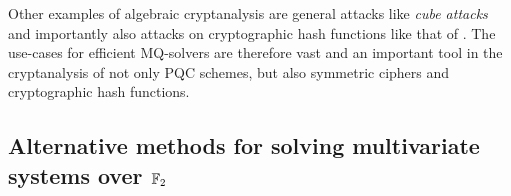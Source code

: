 Other examples of algebraic cryptanalysis are general attacks like \textit{cube attacks} \cite{Videau2011} and importantly also attacks on cryptographic hash functions like that of \cite{fse-2011-23547}. The use-cases for efficient MQ-solvers are therefore vast and an important tool in the cryptanalysis of not only PQC schemes, but also  symmetric ciphers and cryptographic hash functions. 


\subsection{Alternative methods for solving multivariate systems over $\mathbb{F}_2$}

\newpage